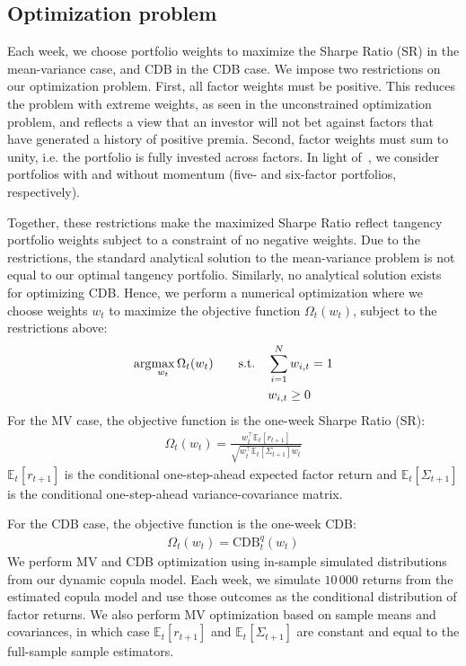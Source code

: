 
\subsection{Optimization problem} %
\label{sub:optimization_problem}

Each week, we choose portfolio weights to maximize the Sharpe Ratio (SR) in the mean-variance case, and CDB in the CDB case. We impose two restrictions on our optimization problem. First, all factor weights must be positive. This reduces the problem with extreme weights, as seen in the unconstrained optimization problem, and reflects a view that an investor will not bet against factors that have generated a history of positive premia. Second, factor weights must sum to unity, i.e. the portfolio is fully invested across factors. In light of~\textcite{Asness2015}, we consider portfolios with and without momentum (five- and six-factor portfolios, respectively).

Together, these restrictions make the maximized Sharpe Ratio reflect tangency portfolio weights subject to a constraint of no negative weights. Due to the restrictions, the standard analytical solution to the mean-variance problem is not equal to our optimal tangency portfolio. Similarly, no analytical solution exists for optimizing CDB. Hence, we perform a numerical optimization where we choose weights $w_t$ to maximize the objective function $\Omega_t(w_t)$, subject to the restrictions above:
\begin{align}
  \arg\!\max_{w_t} \Omega_t(w_t)
    &&\text{\quad s.t.\quad} & \sum_{i=1}^N w_{i,t} = 1 \\
    &&                       & w_{i,t} \ge 0 \notag
\end{align}
For the MV case, the objective function is the one-week Sharpe Ratio (SR):
\begin{align}
  \Omega_t(w_t) = \frac{w_t^\top \mathbb{E}_t[r_{t+1}]}{\sqrt{w_t^\top \mathbb{E}_t[\Sigma_{t+1}] w_t}}
\end{align}
$\mathbb{E}_t[r_{t+1}]$ is the conditional one-step-ahead expected factor return and $\mathbb{E}_t[\Sigma_{t+1}]$ is the conditional one-step-ahead variance-covariance matrix. 

For the CDB case, the objective function is the one-week CDB:
\begin{align}
  \Omega_t(w_t) = \text{CDB}_t^q(w_t)
\end{align}
We perform MV and CDB optimization using in-sample simulated distributions from our dynamic copula model. Each week, we simulate $10\,000$ returns from the estimated copula model and use those outcomes as the conditional distribution of factor returns. We also perform MV optimization based on sample means and covariances, in which case $\mathbb{E}_t[r_{t+1}]$ and $\mathbb{E}_t[\Sigma_{t+1}]$ are constant and equal to the full-sample sample estimators.



